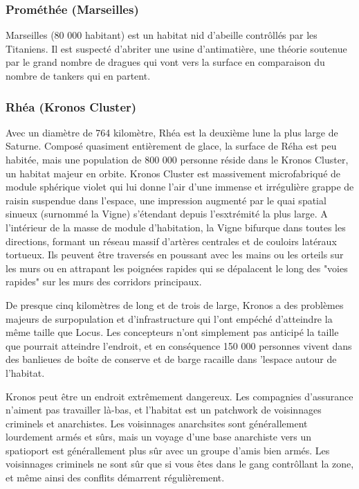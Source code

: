 \subsubsection{Prométhée (Marseilles)} \label{sec:prom-mars} 

Marseilles (80 000 habitant) est un habitat nid d'abeille contrôllés par les Titaniens. Il est suspecté d'abriter une usine d'antimatière, une théorie soutenue par le grand nombre de dragues qui vont vers la surface en comparaison du nombre de tankers qui en partent. 

\subsubsection{Rhéa (Kronos Cluster)} \label{sec:rhea-kronos-cluster} 

Avec un diamètre de 764 kilomètre, Rhéa est la deuxième lune la plus large de Saturne. Composé quasiment entièrement de glace, la surface de Réha est peu habitée, mais une population de 800 000 personne réside dans le Kronos Cluster, un habitat majeur en orbite. Kronos Cluster est massivement microfabriqué de module sphérique violet qui lui donne l'air d'une immense et irrégulière grappe de raisin suspendue dans l'espace, une impression augmenté par le quai spatial sinueux (surnommé la Vigne) s'étendant depuis l'esxtrémité la plus large. A l'intérieur de la masse de module d'habitation, la Vigne bifurque dans toutes les directions, formant un réseau massif d'artères centrales et de couloirs latéraux tortueux. Ils peuvent être traversés en poussant avec les mains ou les orteils sur les murs ou en attrapant les poignées rapides qui se dépalacent le long des "voies rapides" sur les murs des corridors principaux. 

De presque cinq kilomètres de long et de trois de large, Kronos a des problèmes majeurs de surpopulation et d'infrastructure qui l'ont empéché d'atteindre la même taille que Locus. Les concepteurs n'ont simplement pas anticipé la taille que pourrait atteindre l'endroit, et en conséquence 150 000 personnes vivent dans des banlieues de boîte de conserve et de barge racaille dans 'lespace autour de l'habitat. 

Kronos peut être un endroit extrêmement dangereux. Les compagnies d'assurance n'aiment pas travailler là-bas, et l'habitat est un patchwork de voisinnages criminels et anarchistes. Les voisinnages anarchsites sont générallement lourdement armés et sûrs, mais un voyage d'une base anarchiste vers un spatioport est générallement plus sûr avec un groupe d'amis bien armés. Les voisinnages criminels ne sont sûr que si vous êtes dans le gang contrôllant la zone, et même ainsi des conflits démarrent régulièrement. 

